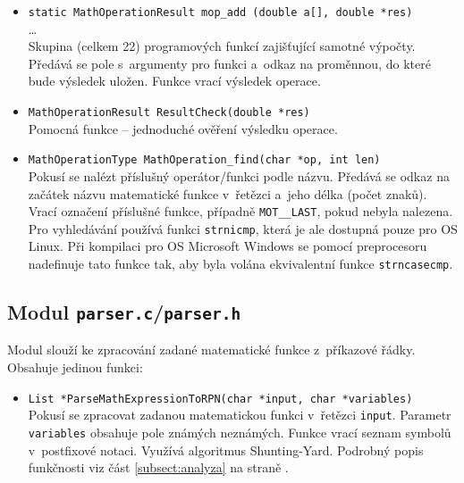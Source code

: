 \documentclass[pdftex,a4paper]{article}
\begin{document}
\begin{itemize}
\item \texttt{static MathOperationResult mop\_add (double a[], double *res)} \\
      \ldots \\
	  Skupina (celkem 22) programových funkcí zajišťující samotné výpočty. Předává se pole s~argumenty pro funkci a~odkaz na proměnnou, do které bude výsledek uložen. Funkce vrací výsledek operace.
	  
\item \texttt{MathOperationResult ResultCheck(double *res)} \\ 
	  Pomocná funkce -- jednoduché ověření výsledku operace.
	  	  
\item \texttt{MathOperationType MathOperation\_find(char *op, int len)} \\ 
	  Pokusí se nalézt příslušný operátor/funkci podle názvu. Předává se odkaz na začátek názvu matematické funkce v~řetězci a~jeho délka (počet znaků). Vrací označení příslušné funkce, případně \texttt{MOT\_\_LAST}, pokud nebyla nalezena.\\
	  Pro vyhledávání používá funkci \texttt{strnicmp}, která je ale dostupná pouze pro OS Linux. Při kompilaci pro OS Microsoft Windows se pomocí preprocesoru nadefinuje tato funkce tak, aby byla volána ekvivalentní funkce \texttt{strncasecmp}.
	  	  	  
\end{itemize}



\subsection{Modul \texttt{parser.c}/\texttt{parser.h}}
Modul slouží ke zpracování zadané matematické funkce z~příkazové řádky. Obsahuje jedinou funkci:

\begin{itemize}
\item \texttt{List *ParseMathExpressionToRPN(char *input, char *variables)} \\
	  Pokusí se zpracovat zadanou matematickou funkci v~řetězci \texttt{input}. Parametr \texttt{variables} obsahuje pole známých neznámých. Funkce vrací seznam symbolů v~postfixové notaci. Využívá algoritmus Shunting-Yard. Podrobný popis funkčnosti viz část \ref{subsect:analyza} na straně \pageref{subsect:analyza}. 
 
\end{itemize}
\end{document}
